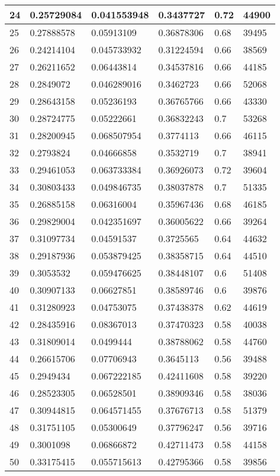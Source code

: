 \begin{longtable}{|l|l|l|l|l|l|}
24 & 0.25729084 & 0.041553948 & 0.3437727 & 0.72 & 44900 \\ \hline 
25 & 0.27888578 & 0.05913109 & 0.36878306 & 0.68 & 39495 \\ \hline 
26 & 0.24214104 & 0.045733932 & 0.31224594 & 0.66 & 38569 \\ \hline 
27 & 0.26211652 & 0.06443814 & 0.34537816 & 0.66 & 44185 \\ \hline 
28 & 0.2849072 & 0.046289016 & 0.3462723 & 0.66 & 52068 \\ \hline 
29 & 0.28643158 & 0.05236193 & 0.36765766 & 0.66 & 43330 \\ \hline 
30 & 0.28724775 & 0.05222661 & 0.36832243 & 0.7 & 53268 \\ \hline 
31 & 0.28200945 & 0.068507954 & 0.3774113 & 0.66 & 46115 \\ \hline 
32 & 0.2793824 & 0.04666858 & 0.3532719 & 0.7 & 38941 \\ \hline 
33 & 0.29461053 & 0.063733384 & 0.36926073 & 0.72 & 39604 \\ \hline 
34 & 0.30803433 & 0.049846735 & 0.38037878 & 0.7 & 51335 \\ \hline 
35 & 0.26885158 & 0.06316004 & 0.35967436 & 0.68 & 46185 \\ \hline 
36 & 0.29829004 & 0.042351697 & 0.36005622 & 0.66 & 39264 \\ \hline 
37 & 0.31097734 & 0.04591537 & 0.3725565 & 0.64 & 44632 \\ \hline 
38 & 0.29187936 & 0.053879425 & 0.38358715 & 0.64 & 44510 \\ \hline 
39 & 0.3053532 & 0.059476625 & 0.38448107 & 0.6 & 51408 \\ \hline 
40 & 0.30907133 & 0.06627851 & 0.38589746 & 0.6 & 39876 \\ \hline 
41 & 0.31280923 & 0.04753075 & 0.37438378 & 0.62 & 44619 \\ \hline 
42 & 0.28435916 & 0.08367013 & 0.37470323 & 0.58 & 40038 \\ \hline 
43 & 0.31809014 & 0.0499444 & 0.38788062 & 0.58 & 44760 \\ \hline 
44 & 0.26615706 & 0.07706943 & 0.3645113 & 0.56 & 39488 \\ \hline 
45 & 0.2949434 & 0.067222185 & 0.42411608 & 0.58 & 39220 \\ \hline 
46 & 0.28523305 & 0.06528501 & 0.38909346 & 0.58 & 38036 \\ \hline 
47 & 0.30944815 & 0.064571455 & 0.37676713 & 0.58 & 51379 \\ \hline 
48 & 0.31751105 & 0.05300649 & 0.37796247 & 0.56 & 39716 \\ \hline 
49 & 0.3001098 & 0.06866872 & 0.42711473 & 0.58 & 44158 \\ \hline 
50 & 0.33175415 & 0.055715613 & 0.42795366 & 0.58 & 39856 \\ \hline 
\end{longtable}